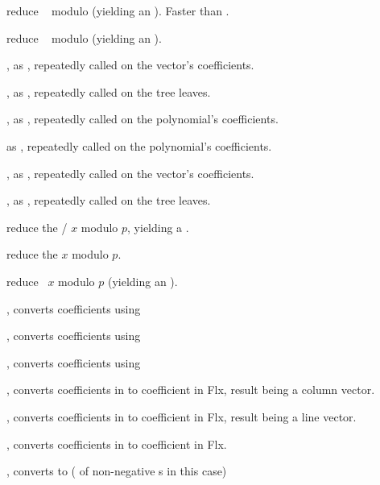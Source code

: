  reduce ~ modulo 
(yielding an ). Faster than .

 reduce ~ modulo 
(yielding an ).

, as , repeatedly
called on the vector's coefficients.

, as , repeatedly
called on the tree leaves.

, as ,
repeatedly called on the polynomial's coefficients.

 as ,
repeatedly called on the polynomial's coefficients.

, as ,
repeatedly called on the vector's coefficients.

, as ,
repeatedly called on the tree leaves.

 reduce the /
$x$ modulo $p$, yielding a .

 reduce the  $x$ modulo $p$.

 reduce ~$x$ modulo $p$
(yielding an ).

, converts coefficients using 

, converts coefficients using 

, converts coefficients using 

, converts coefficients in 
to coefficient in Flx, result being a column vector.

, converts coefficients in 
to coefficient in Flx, result being a line vector.


, converts coefficients in 
to coefficient in Flx.


, converts to  ( of non-negative
s in this case)

